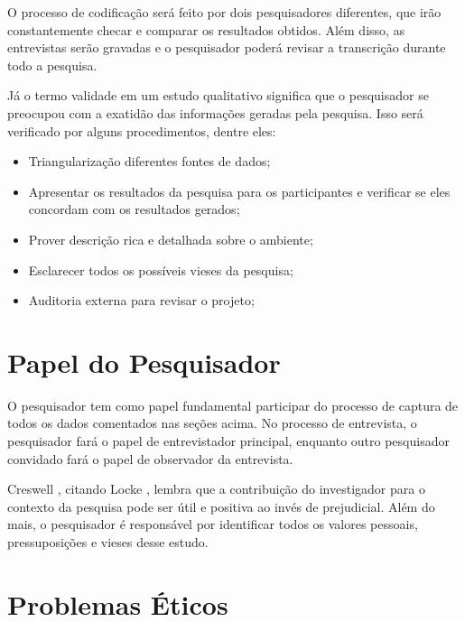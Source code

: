 O processo de codificação será feito por dois pesquisadores diferentes, que 
irão constantemente checar e comparar os resultados obtidos. Além disso, as 
entrevistas serão gravadas e o pesquisador poderá revisar a transcrição  durante
todo a pesquisa.

Já o termo validade em um estudo qualitativo significa que o pesquisador  se
preocupou com a exatidão das informações geradas pela pesquisa. Isso será 
verificado por alguns procedimentos, dentre eles:

\begin{itemize}
	\item Triangularização diferentes fontes de dados;

	\item Apresentar os resultados da pesquisa para os participantes  e verificar
	se eles concordam com os resultados gerados;

	\item Prover descrição rica e detalhada sobre o ambiente;

	\item Esclarecer todos os possíveis vieses da pesquisa;

	\item Auditoria externa para revisar o projeto;
\end{itemize}

\section{Papel do Pesquisador}
\label{sec:planejamento-papel}

O pesquisador tem como papel fundamental participar do processo de  captura de
todos os dados comentados nas seções acima. No processo de entrevista, o 
pesquisador fará o papel de entrevistador principal, enquanto outro  pesquisador
convidado fará o papel de observador da entrevista.

Creswell \cite{creswell}, citando Locke \cite{locke}, lembra
que a contribuição do investigador para o contexto da pesquisa pode ser útil e
positiva ao invés de prejudicial. Além do mais, o pesquisador é responsável por
identificar todos os valores pessoais, pressuposições e vieses desse estudo.

\section{Problemas Éticos}
\label{sec:planejamento-etica}

